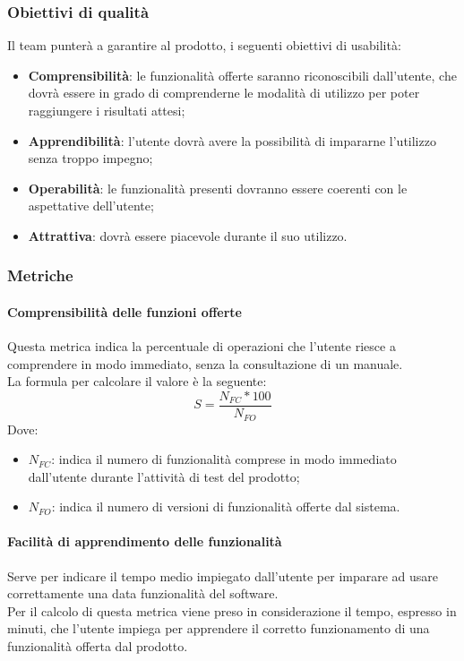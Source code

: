 \documentclass[../PianoDiQualifica.tex]{subfiles}
\begin{document}
				\subsubsection{Obiettivi di qualità}
				Il team punterà a garantire al prodotto, i seguenti obiettivi di usabilità:
				\begin{itemize}
					\item \textbf{Comprensibilità}: le funzionalità offerte saranno riconoscibili dall'utente, che dovrà essere in grado di comprenderne le modalità di utilizzo per poter raggiungere i risultati attesi;
					\item \textbf{Apprendibilità}: l'utente dovrà avere la possibilità di impararne l'utilizzo senza troppo impegno;
					\item \textbf{Operabilità}: le funzionalità presenti dovranno essere coerenti con le aspettative dell'utente;
					\item \textbf{Attrattiva}: dovrà essere piacevole durante il suo utilizzo.
				\end{itemize}

				\subsubsection{Metriche}
				\paragraph{Comprensibilità delle funzioni offerte}
				Questa metrica indica la percentuale di operazioni che l'utente riesce a comprendere in modo immediato, senza la consultazione di un manuale.\\La formula per calcolare il valore è la seguente:
				\begin{equation*}
					S = \frac{N_{FC} * 100}{N_{FO}}
				\end{equation*}
				Dove:
				\begin{itemize}
					\item \textbf{$N_{FC}$}: indica il numero di funzionalità comprese in modo immediato dall'utente durante l'attività di test del prodotto;
					\item \textbf{$N_{FO}$}: indica il numero di versioni di funzionalità offerte dal sistema.
				\end{itemize}
				
				\paragraph{Facilità di apprendimento delle funzionalità}
				Serve per indicare il tempo medio impiegato dall'utente per imparare ad usare correttamente una data funzionalità del software.\\
			Per il calcolo di questa metrica viene preso in considerazione il tempo, espresso in minuti, che l'utente impiega per apprendere il corretto funzionamento di una funzionalità offerta dal prodotto.
				
\end{document}
